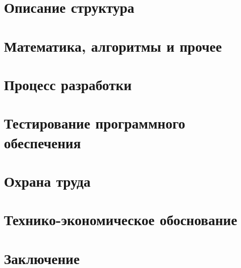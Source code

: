




\newpage
{}
\renewcommand\contentsname{\hfill Содержание \hfill}
\tableofcontents

\setcounter{figure}{0}
\section{Описание структура}

\setcounter{figure}{0}
\section{Математика, алгоритмы и прочее}

\setcounter{figure}{0}
\section{Процесс разработки}

\setcounter{figure}{0}
\section{Тестирование программного обеспечения}

\setcounter{figure}{0}
\section{Охрана труда}

\setcounter{figure}{0}
\section{Технико-экономическое обоснование}

\setcounter{figure}{0}
\section{Заключение}

\newpage
\renewcommand{\refname}{Список использованных источников}


